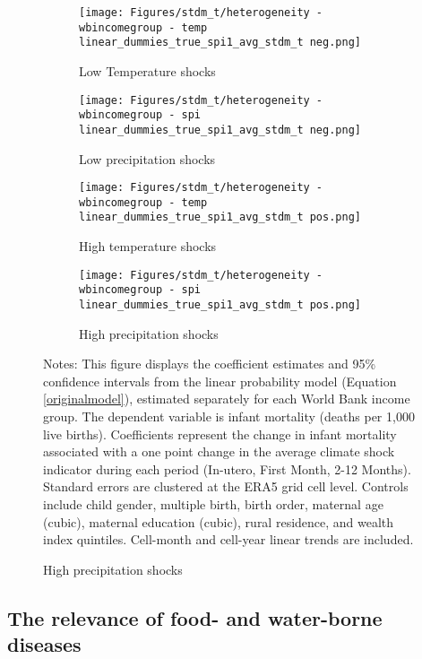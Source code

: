 \documentclass[a4paper]{article}
\begin{document}
\begin{figure}[t!]
    \caption{Climate shocks impacts on different income groups}
    \label{fig:income_heterogeneity}
    \begin{center}
        
    \begin{subfigure}[t]{0.49\textwidth}
        \centering
        \texttt{[image: Figures/stdm\_t/heterogeneity - wbincomegroup - temp linear\_dummies\_true\_spi1\_avg\_stdm\_t neg.png]}
        \caption{Low Temperature shocks}
    \end{subfigure}%
    \begin{subfigure}[t]{0.49\textwidth}
        \centering
        \texttt{[image: Figures/stdm\_t/heterogeneity - wbincomegroup - spi linear\_dummies\_true\_spi1\_avg\_stdm\_t neg.png]}
        \caption{Low precipitation shocks}
    \end{subfigure} \hfill
    \begin{subfigure}[t]{0.49\textwidth}
        \centering
        \texttt{[image: Figures/stdm\_t/heterogeneity - wbincomegroup - temp linear\_dummies\_true\_spi1\_avg\_stdm\_t pos.png]}
        \caption{High temperature shocks}    
    \end{subfigure}
    \begin{subfigure}[t]{0.49\textwidth}
        \centering
        \texttt{[image: Figures/stdm\_t/heterogeneity - wbincomegroup - spi linear\_dummies\_true\_spi1\_avg\_stdm\_t pos.png]}
        \caption{High precipitation shocks}    
    \end{subfigure}
    \end{center}
    \footnotesize{Notes: This figure displays the coefficient estimates and 95\% confidence intervals from the linear probability model (Equation \ref{originalmodel}), estimated separately for each World Bank income group.  The dependent variable is infant mortality (deaths per 1,000 live births).  Coefficients represent the change in infant mortality associated with a one point change in the average climate shock indicator during each period (In-utero, First Month, 2-12 Months).  Standard errors are clustered at the ERA5 grid cell level.  Controls include child gender, multiple birth, birth order, maternal age (cubic), maternal education (cubic), rural residence, and wealth index quintiles. Cell-month and cell-year linear trends are included.}

\end{figure}

\subsection{The relevance of food- and water-borne diseases}
\end{document}
